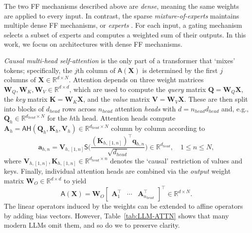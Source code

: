 \documentclass[namedate,webpdf,imanum]{ima-authoring-template}
\newcommand{\Real}{\mathbb{R}}
\newcommand{\Matrix}[1]{\mathbf{#1}}
\newcommand{\trans}{\intercal}
\newcommand{\Layer}[1]{\mathsf{#1}}
\numberwithin{equation}{section}
\begin{document}
The two FF mechanisms described above are \emph{dense}, meaning the same weights are applied to every input.
In contrast, the sparse \emph{mixture-of-experts} maintains multiple dense FF mechanisms, or \emph{experts} \citep{shazeer2017outrageously}.
For each input, a gating mechanism selects a subset of experts and computes a weighted sum of their outputs.
In this work, we focus on architectures with dense FF mechanisms.

\emph{Causal multi-head self-attention} \citep{vaswani2017attention} is the only part of a transformer that `mixes' tokens; specifically, the $j$th column of $\Layer{A}(\Matrix{X})$ is determined by the first $j$ columns of $\Matrix{X} \in \Real^{d \times N}$.
Attention depends on three weight matrices $\Matrix{W}_{Q}, \Matrix{W}_{K}, \Matrix{W}_{V} \in \Real^{d \times d}$, which are used to compute the \emph{query} matrix $\Matrix{Q} = \Matrix{W}_{Q} \Matrix{X}$, the \emph{key} matrix  $\Matrix{K} = \Matrix{W}_{K} \Matrix{X}$, and the \emph{value} matrix $\Matrix{V} = \Matrix{W}_{V} \Matrix{X}$.
These are then split into blocks of $d_{head}$ rows across $n_{head}$ attention \emph{heads} with $d = n_{head} d_{head}$ and, e.g., $\Matrix{Q}_h \in \Real^{d_{head} \times N}$ for the $h$th head.
Attention heads compute $\Matrix{A}_h = \Layer{AH}(\Matrix{Q}_h, \Matrix{K}_h, \Matrix{V}_h) \in \Real^{d_{head} \times N}$ column by column according to
\begin{equation}
\label{eq:sh-attention}
    \Matrix{a}_{h, n} = \Matrix{V}_{h, [1,n]} \Layer{S}\bigg( \frac{(\Matrix{K}_{h, [1,n]})^\trans \Matrix{q}_{h,n}}{\sqrt{d_{head}}} \bigg) \in \Real^{d_{head}}, \quad 1 \leq n \leq N,
\end{equation}
where $\Matrix{V}_{h, [1,n]}, \Matrix{K}_{h, [1,n]} \in \Real^{d_{head} \times n}$ denotes the `causal' restriction of values and keys.
Finally, individual attention heads are combined via the \emph{output} weight matrix $\Matrix{W}_O \in \Real^{d \times d}$ to yield
\begin{equation}
\label{eq:mh-attention}
    \Layer{A}(\Matrix{X}) = \Matrix{W}_O \begin{bmatrix}
        \Matrix{A}_1^\trans & \cdots & \Matrix{A}_{n_{head}}^\trans
    \end{bmatrix}^\trans \in \Real^{d \times N}.
\end{equation}
The linear operators induced by the weights can be extended to affine operators by adding bias vectors. However, Table~\ref{tab:LLM-ATTN} shows that many modern LLMs omit them, and so do we to preserve clarity.
\end{document}
